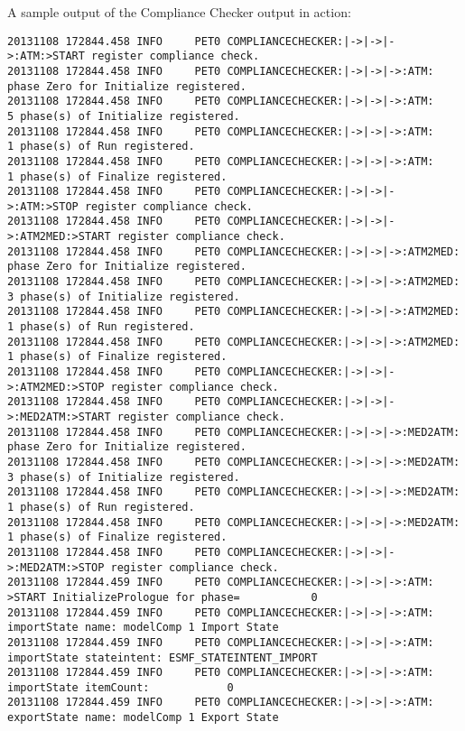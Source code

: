 A sample output of the Compliance Checker output in action:

{\tiny
\begin{verbatim}
20131108 172844.458 INFO     PET0 COMPLIANCECHECKER:|->|->|->:ATM:>START register compliance check.
20131108 172844.458 INFO     PET0 COMPLIANCECHECKER:|->|->|->:ATM: phase Zero for Initialize registered.
20131108 172844.458 INFO     PET0 COMPLIANCECHECKER:|->|->|->:ATM:             5 phase(s) of Initialize registered.
20131108 172844.458 INFO     PET0 COMPLIANCECHECKER:|->|->|->:ATM:             1 phase(s) of Run registered.
20131108 172844.458 INFO     PET0 COMPLIANCECHECKER:|->|->|->:ATM:             1 phase(s) of Finalize registered.
20131108 172844.458 INFO     PET0 COMPLIANCECHECKER:|->|->|->:ATM:>STOP register compliance check.
20131108 172844.458 INFO     PET0 COMPLIANCECHECKER:|->|->|->:ATM2MED:>START register compliance check.
20131108 172844.458 INFO     PET0 COMPLIANCECHECKER:|->|->|->:ATM2MED: phase Zero for Initialize registered.
20131108 172844.458 INFO     PET0 COMPLIANCECHECKER:|->|->|->:ATM2MED:             3 phase(s) of Initialize registered.
20131108 172844.458 INFO     PET0 COMPLIANCECHECKER:|->|->|->:ATM2MED:             1 phase(s) of Run registered.
20131108 172844.458 INFO     PET0 COMPLIANCECHECKER:|->|->|->:ATM2MED:             1 phase(s) of Finalize registered.
20131108 172844.458 INFO     PET0 COMPLIANCECHECKER:|->|->|->:ATM2MED:>STOP register compliance check.
20131108 172844.458 INFO     PET0 COMPLIANCECHECKER:|->|->|->:MED2ATM:>START register compliance check.
20131108 172844.458 INFO     PET0 COMPLIANCECHECKER:|->|->|->:MED2ATM: phase Zero for Initialize registered.
20131108 172844.458 INFO     PET0 COMPLIANCECHECKER:|->|->|->:MED2ATM:             3 phase(s) of Initialize registered.
20131108 172844.458 INFO     PET0 COMPLIANCECHECKER:|->|->|->:MED2ATM:             1 phase(s) of Run registered.
20131108 172844.458 INFO     PET0 COMPLIANCECHECKER:|->|->|->:MED2ATM:             1 phase(s) of Finalize registered.
20131108 172844.458 INFO     PET0 COMPLIANCECHECKER:|->|->|->:MED2ATM:>STOP register compliance check.
20131108 172844.459 INFO     PET0 COMPLIANCECHECKER:|->|->|->:ATM: >START InitializePrologue for phase=           0
20131108 172844.459 INFO     PET0 COMPLIANCECHECKER:|->|->|->:ATM: importState name: modelComp 1 Import State
20131108 172844.459 INFO     PET0 COMPLIANCECHECKER:|->|->|->:ATM: importState stateintent: ESMF_STATEINTENT_IMPORT
20131108 172844.459 INFO     PET0 COMPLIANCECHECKER:|->|->|->:ATM: importState itemCount:            0
20131108 172844.459 INFO     PET0 COMPLIANCECHECKER:|->|->|->:ATM: exportState name: modelComp 1 Export State

\end{verbatim}}
